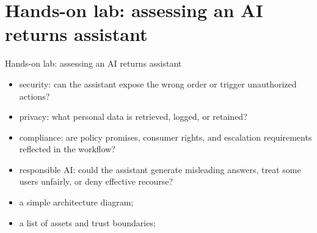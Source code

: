 \documentclass[aspectratio=169]{beamer}
\begin{document}
\section{Hands-on lab: assessing an AI returns assistant}

\begin{frame}{Hands-on lab: assessing an AI returns assistant}
  \begin{itemize}
    \item security: can the assistant expose the wrong order or trigger unauthorized actions?
    \item privacy: what personal data is retrieved, logged, or retained?
    \item compliance: are policy promises, consumer rights, and escalation requirements reflected in the workflow?
    \item responsible AI: could the assistant generate misleading answers, treat some users unfairly, or deny effective recourse?
    \item a simple architecture diagram;
    \item a list of assets and trust boundaries;
  \end{itemize}
\end{frame}
\end{document}
